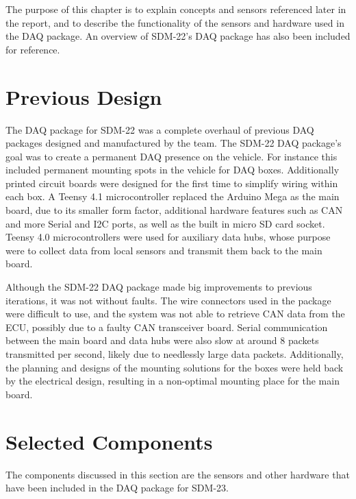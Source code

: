 The purpose of this chapter is to explain concepts and sensors referenced later in the report, and to describe the functionality of the sensors and hardware used in the DAQ package.
An overview of SDM-22's DAQ package has also been included for reference.
\section{Previous Design}
The DAQ package for SDM-22 was a complete overhaul of previous DAQ packages designed and manufactured by the team.
The SDM-22 DAQ package's goal was to create a permanent DAQ presence on the vehicle.
For instance this included permanent mounting spots in the vehicle for DAQ boxes.
Additionally printed circuit boards were designed for the first time to simplify wiring within each box.
A Teensy 4.1 microcontroller replaced the Arduino Mega as the main board, due to its smaller form factor, additional hardware features such as CAN and more Serial and I2C ports, as well as the built in micro SD card socket.
Teensy 4.0 microcontrollers were used for auxiliary data hubs, whose purpose were to collect data from local sensors and transmit them back to the main board.
\vspace{1em}

Although the SDM-22 DAQ package made big improvements to previous iterations, it was not without faults.
The wire connectors used in the package were difficult to use, and the system was not able to retrieve CAN data from the ECU, possibly due to a faulty CAN transceiver board.
Serial communication between the main board and data hubs were also slow at around 8 packets transmitted per second, likely due to needlessly large data packets.
Additionally, the planning and designs of the mounting solutions for the boxes were held back by the electrical design, resulting in a non-optimal mounting place for the main board.

\section{Selected Components}
The components discussed in this section are the sensors and other hardware that have been included in the DAQ package for SDM-23.

